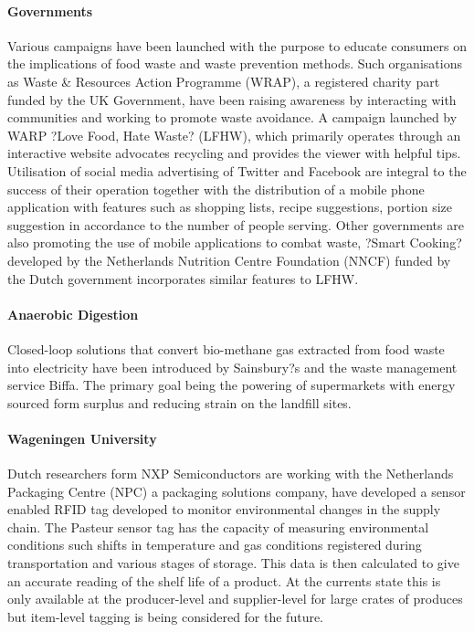 \documentclass[a4paper, 11pt]{article}
\begin{document}
\paragraph{Governments} Various campaigns have been launched with the purpose to educate consumers on the implications of food waste and waste prevention methods. Such organisations as Waste \& Resources Action Programme (WRAP), a registered charity part funded by the UK Government, have been raising awareness by interacting with communities and working to promote waste avoidance. A campaign launched by WARP ?Love Food, Hate Waste? (LFHW), which primarily operates through an interactive website advocates recycling and provides the viewer with helpful tips. Utilisation of social media advertising of Twitter and Facebook are integral to the success of their operation together with the distribution of a mobile phone application with features such as shopping lists, recipe suggestions, portion size suggestion in accordance to the number of people serving. Other governments are also promoting the use of mobile applications to combat waste, ?Smart Cooking? developed by the Netherlands Nutrition Centre Foundation (NNCF) funded by the Dutch government incorporates similar features to LFHW.

\paragraph{Anaerobic Digestion}Closed-loop solutions that convert bio-methane gas extracted from food waste into electricity have been introduced by Sainsbury?s and the waste management service Biffa. The primary goal being the powering of supermarkets with energy sourced form surplus and reducing strain on the landfill sites.

\paragraph{Wageningen University}Dutch researchers form NXP Semiconductors are working with the Netherlands Packaging Centre (NPC) a packaging solutions company, have developed a sensor enabled RFID tag developed to monitor environmental changes in the supply chain. The Pasteur sensor tag has the capacity of measuring environmental conditions such shifts in temperature and gas conditions registered during transportation and various stages of storage. This data is then calculated to give an accurate reading of the shelf life of a product. At the currents state this is only available at the producer-level and supplier-level for large crates of produces but item-level tagging is being considered for the future. 
\end{document}
